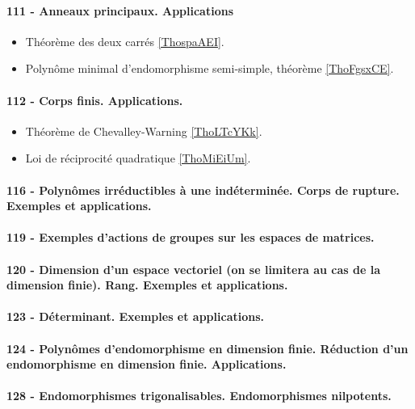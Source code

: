 \paragraph{111 - Anneaux principaux. Applications}
\begin{itemize}
    \item Théorème des deux carrés \ref{ThospaAEI}.
    \item Polynôme minimal d'endomorphisme semi-simple, théorème \ref{ThoFgsxCE}.
\end{itemize}

\paragraph{112 - Corps finis. Applications.}
\begin{itemize}
    \item Théorème de Chevalley-Warning \ref{ThoLTcYKk}.
    \item Loi de réciprocité quadratique \ref{ThoMiEiUm}.
\end{itemize}

\paragraph{116 - Polynômes irréductibles à une indéterminée. Corps de rupture. Exemples et applications.}
\paragraph{119 - Exemples d’actions de groupes sur les espaces de matrices.}
\paragraph{120 - Dimension d’un espace vectoriel (on se limitera au cas de la dimension finie). Rang. Exemples et applications.}
\paragraph{123 - Déterminant. Exemples et applications.}
\paragraph{124 - Polynômes d’endomorphisme en dimension finie. Réduction d’un endomorphisme en dimension finie. Applications.}
\paragraph{128 - Endomorphismes trigonalisables. Endomorphismes nilpotents.}
